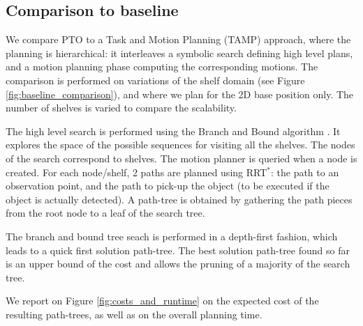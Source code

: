 \documentclass[letterpaper, 10 pt, conference]{ieeeconf}  %
\begin{document}

\subsection{Comparison to baseline} \label{experiment:baseline comparison}
We compare PTO to a Task and Motion Planning (TAMP) approach, where the planning is hierarchical: it interleaves a symbolic search defining high level plans, and a motion planning phase computing the corresponding motions. The comparison is performed on variations of the shelf domain (see Figure \ref{fig:baseline_comparison}), and where we plan for the  2D base position only. The number of shelves is varied to compare the scalability.

The high level search is performed using the Branch and Bound algorithm \cite{MORRISON201679}. It explores the space of the possible sequences for visiting all the shelves. The nodes of the search correspond to shelves. The motion planner is queried when a node is created. For each node/shelf, 2 paths are planned using RRT$^{*}$: the path to an observation point, and the path to pick-up the object (to be executed if the object is actually detected). A path-tree is obtained by gathering the path pieces from the root node to a leaf of the search tree. 

The branch and bound tree seach is performed in a depth-first fashion, which leads to a quick first solution path-tree. The best solution path-tree found so far is an upper bound of the cost and allows the pruning of a majority of the search tree.


We report on Figure \ref{fig:costs_and_runtime} on the expected cost of the resulting path-trees, as well as on the overall planning time.

\end{document}
